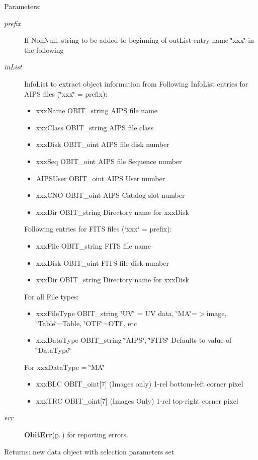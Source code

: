 \begin{Desc}
\item[Parameters:]
\begin{description}
\item[{\em prefix}]If Non\-Null, string to be added to beginning of out\-List entry name \char`\"{}xxx\char`\"{} in the following \item[{\em in\-List}]Info\-List to extract object information from Following Info\-List entries for AIPS files (\char`\"{}xxx\char`\"{} = prefix): \begin{itemize}
\item xxx\-Name OBIT\_\-string AIPS file name \item xxx\-Class OBIT\_\-string AIPS file class \item xxx\-Disk OBIT\_\-oint AIPS file disk number \item xxx\-Seq OBIT\_\-oint AIPS file Sequence number \item AIPSUser OBIT\_\-oint AIPS User number \item xxx\-CNO OBIT\_\-oint AIPS Catalog slot number \item xxx\-Dir OBIT\_\-string Directory name for xxx\-Disk\end{itemize}
Following entries for FITS files (\char`\"{}xxx\char`\"{} = prefix): \begin{itemize}
\item xxx\-File OBIT\_\-string FITS file name \item xxx\-Disk OBIT\_\-oint FITS file disk number \item xxx\-Dir OBIT\_\-string Directory name for xxx\-Disk\end{itemize}
For all File types: \begin{itemize}
\item xxx\-File\-Type OBIT\_\-string \char`\"{}UV\char`\"{} = UV data, \char`\"{}MA\char`\"{}=$>$image, \char`\"{}Table\char`\"{}=Table, \char`\"{}OTF\char`\"{}=OTF, etc \item xxx\-Data\-Type OBIT\_\-string \char`\"{}AIPS\char`\"{}, \char`\"{}FITS\char`\"{} Defaults to value of \char`\"{}Data\-Type\char`\"{}\end{itemize}
For xxx\-Data\-Type = \char`\"{}MA\char`\"{} \begin{itemize}
\item xxx\-BLC OBIT\_\-oint[7] (Images only) 1-rel bottom-left corner pixel \item xxx\-TRC OBIT\_\-oint[7] (Images Only) 1-rel top-right corner pixel \end{itemize}
\item[{\em err}]{\bf Obit\-Err}{\rm (p.\,\pageref{structObitErr})} for reporting errors. \end{description}
\end{Desc}
\begin{Desc}
\item[Returns:]new data object with selection parameters set \end{Desc}
